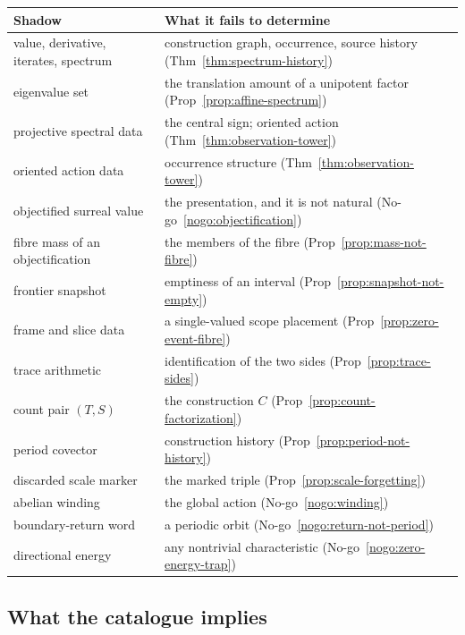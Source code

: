 \begin{center}
\small
\begin{longtable}{@{}p{}p{}@{}}
\toprule
Shadow & What it fails to determine \\
\midrule
\endhead
value, derivative, iterates, spectrum & construction graph, occurrence, source history
  (Thm~\ref{thm:spectrum-history}) \\
eigenvalue set & the translation amount of a unipotent factor
  (Prop~\ref{prop:affine-spectrum}) \\
projective spectral data & the central sign; oriented action
  (Thm~\ref{thm:observation-tower}) \\
oriented action data & occurrence structure
  (Thm~\ref{thm:observation-tower}) \\
objectified surreal value & the presentation, and it is not natural
  (No-go~\ref{nogo:objectification}) \\
fibre mass of an objectification & the members of the fibre
  (Prop~\ref{prop:mass-not-fibre}) \\
frontier snapshot & emptiness of an interval
  (Prop~\ref{prop:snapshot-not-empty}) \\
frame and slice data & a single-valued scope placement
  (Prop~\ref{prop:zero-event-fibre}) \\
trace arithmetic & identification of the two sides
  (Prop~\ref{prop:trace-sides}) \\
count pair $(T,S)$ & the construction $C$
  (Prop~\ref{prop:count-factorization}) \\
period covector & construction history
  (Prop~\ref{prop:period-not-history}) \\
discarded scale marker & the marked triple
  (Prop~\ref{prop:scale-forgetting}) \\
abelian winding & the global action
  (No-go~\ref{nogo:winding}) \\
boundary-return word & a periodic orbit
  (No-go~\ref{nogo:return-not-period}) \\
directional energy & any nontrivial characteristic
  (No-go~\ref{nogo:zero-energy-trap}) \\
\bottomrule
\end{longtable}
\end{center}

\subsection{What the catalogue implies}

